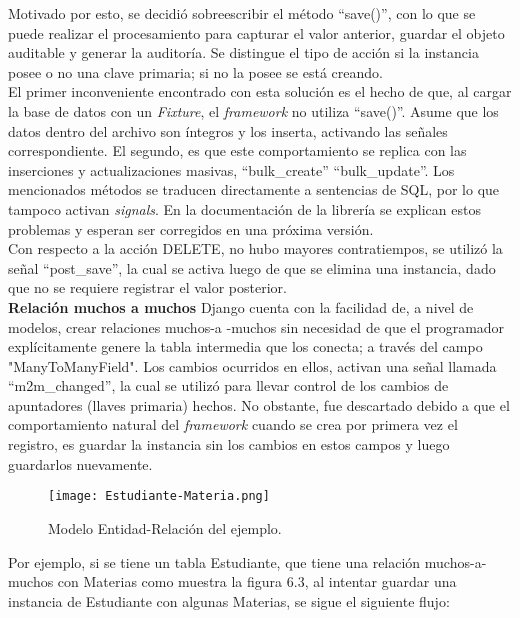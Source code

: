 Motivado por esto, se decidió sobreescribir el método “save()”, con lo que se puede realizar el procesamiento para capturar el valor anterior, guardar el objeto auditable y generar la auditoría. Se distingue el tipo de acción si la instancia posee o no una clave primaria; si no la posee se está creando.\\

El primer inconveniente encontrado con esta solución es el hecho de que, al cargar la base de datos con un \textit{Fixture}, el \textit{framework} no utiliza “save()”. Asume que los datos dentro del archivo son íntegros y los inserta, activando las señales correspondiente. El segundo, es que este comportamiento se replica con las inserciones y actualizaciones masivas, “bulk\_create” “bulk\_update”. Los mencionados métodos se traducen directamente a sentencias de SQL, por lo que tampoco activan \textit{signals}.  En la documentación de la librería se explican estos problemas y esperan ser corregidos en una próxima versión.\\

Con respecto a la acción DELETE, no hubo mayores contratiempos, se utilizó la señal “post\_save”, la cual se activa luego de que se elimina una instancia, dado que no se requiere registrar el valor posterior.\\


\textbf{Relación muchos a muchos} Django cuenta con la facilidad de, a nivel de modelos, crear relaciones muchos-a -muchos sin necesidad de que el programador explícitamente genere la tabla intermedia que los conecta; a través del campo "ManyToManyField". Los cambios ocurridos en ellos, activan una señal llamada “m2m\_changed”, la cual se utilizó para llevar control de los cambios de apuntadores (llaves primaria) hechos. No obstante, fue descartado debido a que el comportamiento natural del \textit{framework} cuando se crea por primera vez el registro, es guardar la instancia sin los cambios en estos campos y luego guardarlos nuevamente.\\

\begin{figure}[h]
\centering
\texttt{[image: Estudiante-Materia.png]}
\caption{Modelo Entidad-Relación del ejemplo.}
\label{fig:figura6.3}
\end{figure}

Por ejemplo, si se tiene un tabla Estudiante, que tiene una relación muchos-a-muchos con Materias como muestra la figura 6.3, al intentar guardar una instancia de Estudiante con algunas Materias, se sigue el siguiente flujo:\\

